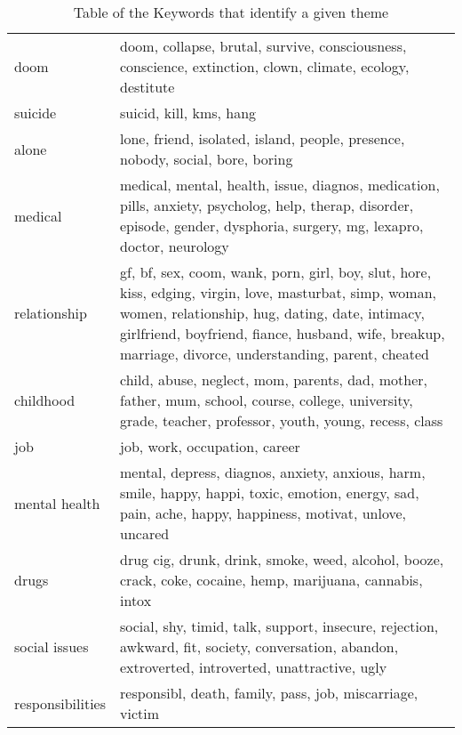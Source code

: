 \documentclass[../report.tex]{subfiles}
\begin{document}
\begin{table*}[ht]
\begin{tabular}{| l | l |}
   doom &  \multicolumn{1}{p{12cm}|}{doom, collapse, brutal, survive, consciousness, conscience, extinction, clown, climate, ecology, destitute} \\
   suicide &  \multicolumn{1}{p{12cm}|}{suicid, kill, kms, hang} \\
   alone &  \multicolumn{1}{p{12cm}|}{lone, friend, isolated, island, people, presence, nobody, social, bore, boring} \\
    medical &  \multicolumn{1}{p{12cm}|}{medical, mental, health, issue, diagnos, medication, pills, anxiety, psycholog, help, therap, disorder, episode, gender, dysphoria, surgery, mg, lexapro, doctor, neurology} \\
    relationship &  \multicolumn{1}{p{12cm}|}{gf, bf, sex, coom, wank, porn, girl, boy, slut, hore, kiss, edging, virgin, love, masturbat, simp, woman, women, relationship, hug, dating, date, intimacy, girlfriend, boyfriend, fiance, husband, wife, breakup, marriage, divorce, understanding, parent, cheated} \\
   childhood &  \multicolumn{1}{p{12cm}|}{child, abuse, neglect, mom, parents, dad, mother, father, mum, school, course, college, university, grade, teacher, professor, youth, young, recess, class} \\
   job &  \multicolumn{1}{p{12cm}|}{job, work, occupation, career } \\
   mental health &  \multicolumn{1}{p{12cm}|}{mental, depress, diagnos, anxiety, anxious, harm, smile, happy, happi, toxic, emotion, energy, sad, pain, ache, happy, happiness, motivat, unlove, uncared} \\
   drugs &  \multicolumn{1}{p{12cm}|}{drug cig, drunk, drink, smoke, weed, alcohol, booze, crack, coke, cocaine, hemp, marijuana, cannabis, intox} \\
    social issues &  \multicolumn{1}{p{12cm}|}{social, shy, timid, talk, support, insecure, rejection, awkward, fit, society, conversation, abandon, extroverted, introverted, unattractive, ugly} \\
    responsibilities &  \multicolumn{1}{p{12cm}|}{responsibl, death, family, pass, job, miscarriage, victim} \\
        \bottomrule
        \end{tabular}
        \caption{Table of the Keywords that identify a given theme}
        \label{tab:keywords}
\end{table*}
\end{document}

